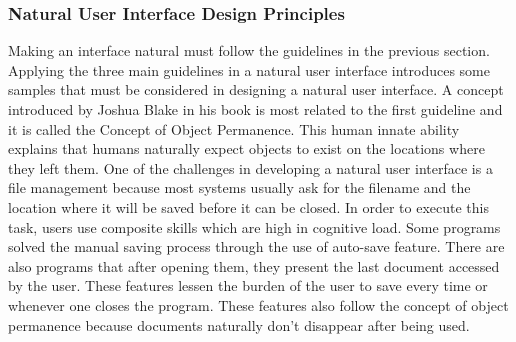 \subsubsection{Natural User Interface Design Principles}

Making an interface natural must follow the guidelines in the previous section. Applying the three main guidelines in a natural user interface introduces some samples that must be considered in designing a natural user interface. A concept introduced by Joshua Blake in his book \cite{blake2011natural} is most related to the first guideline and it is called the Concept of Object Permanence. This human innate ability explains that humans naturally expect objects to exist on the locations where they left them. One of the challenges in developing a natural user interface is a file management because most systems usually ask for the filename and the location where it will be saved before it can be closed. In order to execute this task, users use composite skills which are high in cognitive load. Some programs solved the manual saving process through the use of auto-save feature. There are also programs that after opening them, they present the last document accessed by the user. These features lessen the burden of the user to save every time or whenever one closes the program. These features also follow the concept of object permanence because documents naturally don't disappear after being used.

